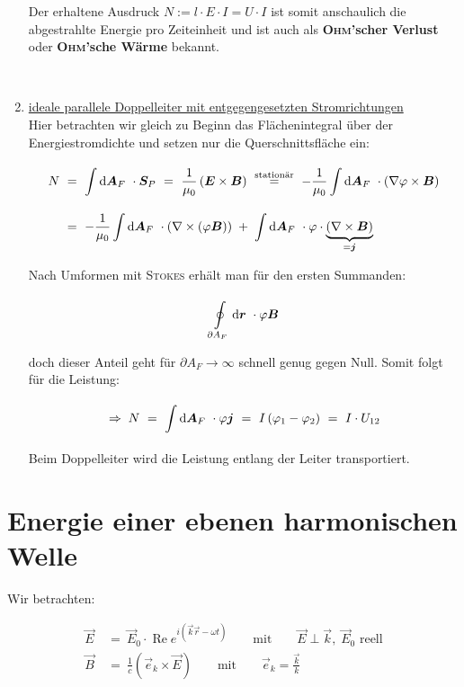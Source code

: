 \begin{enumerate}[label=\roman*]
Der erhaltene Ausdruck $N := l \cdot E \cdot I = U \cdot I$ ist somit anschaulich die abgestrahlte Energie pro Zeiteinheit und ist auch als \textbf{\textsc{Ohm}'scher Verlust} oder \textbf{\textsc{Ohm}'sche Wärme} bekannt.

\ \\

\item \underline{ideale parallele Doppelleiter mit entgegengesetzten Stromrichtungen}
\ \\

Hier betrachten wir gleich zu Beginn das Flächenintegral über der Energiestromdichte und setzen nur die Querschnittsfläche ein:

\begin{align*}
N \ &= \ \int\limits_{{}}^{{}}\mathrm{d}{\bm{A}_F}\  \cdot \bm{S}_P \ = \ \frac{1}{\mu_0} \left(\bm{E}\times\bm{B}\right) \ \overset{\text{stationär}}{=} \ - \frac{1}{\mu_0} \int\limits_{{}}^{{}}\mathrm{d}{\bm{A}_F}\  \cdot \left(\nabla \varphi \times \bm{B}\right)\\
&= \ - \frac{1}{\mu_0} \int\limits_{{}}^{{}}\mathrm{d}{\bm{A}_F}\  \cdot \left(\nabla\times\left(\varphi\bm{B}\right)\right) \; + \; \int\limits_{{}}^{{}}\mathrm{d}{\bm{A}_F}\ \cdot\varphi\cdot\underbrace{\left(\nabla\times\bm{B}\right)}_{=\bm{j}}
\end{align*}

Nach Umformen mit \textsc{Stokes} erhält man für den ersten Summanden:

\begin{equation*}
\oint\limits_{{\partial A_F}}^{{}}\mathrm{d}{\bm{r}}\   \cdot \varphi \bm{B}
\end{equation*}

doch dieser Anteil geht für $\partial A_F \rightarrow \infty$ schnell genug gegen Null. Somit folgt für die Leistung:

\begin{equation*}
\Rightarrow \; N \ = \ \Int{}{}{\vec{A}_F} \cdot \varphi \vec{j} \ = \ I \left(\varphi_1 - \varphi_2 \right) \ = \ I \cdot U_{12}
\end{equation*}
Beim Doppelleiter wird die Leistung entlang der Leiter transportiert.
\end{enumerate}


\section{Energie einer ebenen harmonischen Welle}

Wir betrachten:

\begin{align*}
\vec{E} \ &= \ \vec{E}_0 \cdot \operatorname{Re} e^{i\left(\vec{k}\vec{r}-\omega t\right)} \qquad \text{mit} \qquad \vec{E}\perp\vec{k}, \; \vec{E}_0 \text{ reell}\\
\vec{B} \ &= \ \frac{1}{c}\left(\vec{e}_k\times\vec{E}\right) \qquad \text{mit} \qquad \vec{e}_k = \frac{\vec{k}}{k}
\end{align*}

